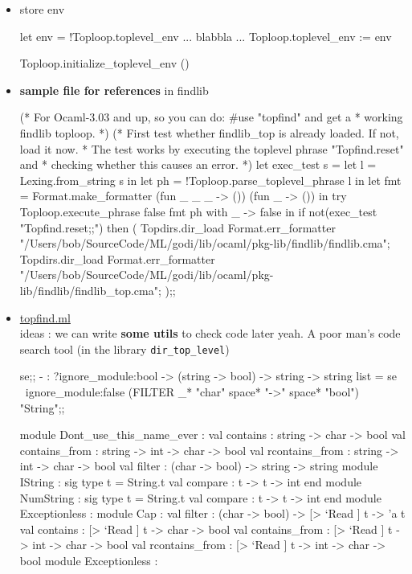 \begin{enumerate}
\begin{itemize}
\item store env

  \begin{bluecode}
let env = !Toploop.toplevel_env
... blabbla ...     
Toploop.toplevel_env := env     
\end{bluecode}
\begin{bluecode}
Toploop.initialize_toplevel_env ()  
\end{bluecode}
  \item {\bf sample file  for references } in findlib


\begin{bluecode}
(* For Ocaml-3.03 and up, so you can do: #use "topfind" and get a
 * working findlib toploop.
 *)
(* First test whether findlib_top is already loaded. If not, load it now.
 * The test works by executing the toplevel phrase "Topfind.reset" and
 * checking whether this causes an error.
 *)
let exec_test s =
  let l = Lexing.from_string s in
  let ph = !Toploop.parse_toplevel_phrase l in
  let fmt = Format.make_formatter (fun _ _ _ -> ()) (fun _ -> ()) in
  try
    Toploop.execute_phrase false fmt ph
  with
      _ -> false
in
if not(exec_test "Topfind.reset;;") then (
  Topdirs.dir_load Format.err_formatter "/Users/bob/SourceCode/ML/godi/lib/ocaml/pkg-lib/findlib/findlib.cma";
  Topdirs.dir_load Format.err_formatter "/Users/bob/SourceCode/ML/godi/lib/ocaml/pkg-lib/findlib/findlib_top.cma";
);;
\end{bluecode}

    
  \item \href{file:/Users/bob/SourceCode/ML/godi/build/distfiles/findlib-1.2.7/src/findlib/topfind.ml}{topfind.ml} \\
    ideas : we can write \textbf{some utils} to check code later 
    yeah. A poor man's code search tool (in the library \verb|dir_top_level|)


\begin{alternate}
se;;
- : ?ignore_module:bool -> (string -> bool) -> string -> string list =
se ~ignore_module:false (FILTER _*  "char" space* "->" space* "bool") "String";;
\end{alternate}

\begin{bluecode}
module Dont_use_this_name_ever :
    val contains : string -> char -> bool
    val contains_from : string -> int -> char -> bool
    val rcontains_from : string -> int -> char -> bool
    val filter : (char -> bool) -> string -> string
    module IString : sig type t = String.t val compare : t -> t -> int end
    module NumString : sig type t = String.t val compare : t -> t -> int end
    module Exceptionless :
    module Cap :
        val filter : (char -> bool) -> [> `Read ] t -> 'a t
        val contains : [> `Read ] t -> char -> bool
        val contains_from : [> `Read ] t -> int -> char -> bool
        val rcontains_from : [> `Read ] t -> int -> char -> bool
        module Exceptionless :
\end{bluecode}



\end{itemize}
\end{enumerate}
